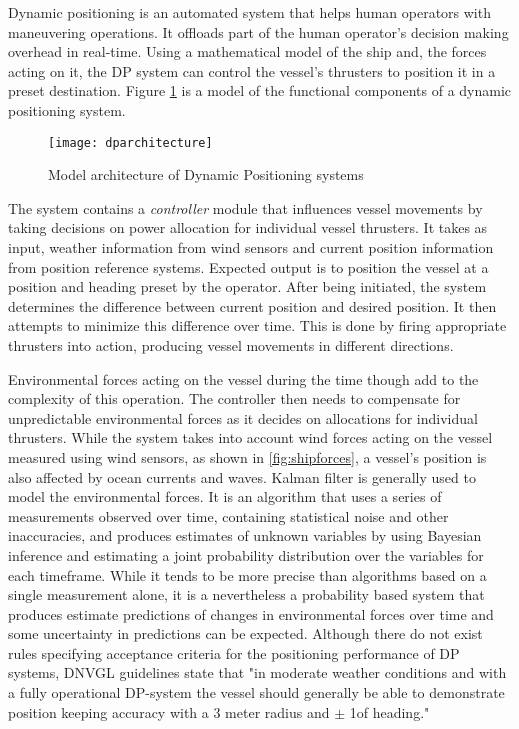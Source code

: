 Dynamic positioning is an automated system that helps human operators with maneuvering operations. It offloads part of the human operator's decision making overhead in real-time. Using a mathematical model of the ship and, the forces acting on it, the DP system can control the vessel's thrusters to position it in a preset destination. Figure \ref{fig:dparchitecture} is a model of the functional components of a dynamic positioning system. 

\begin{figure}
	\centering
	\texttt{[image: dparchitecture]}
	\caption{Model architecture of Dynamic Positioning systems}
	\label{fig:dparchitecture}
\end{figure}


The system contains a \textit{controller} module that influences vessel movements by taking decisions on power allocation for individual vessel thrusters. It takes as input, weather information from wind sensors and current position information from position reference systems. Expected output is to position the vessel at a position and heading preset by the operator. After being initiated, the system determines the difference between current position and desired position. It then attempts to minimize this difference over time. This is done by firing appropriate thrusters into action, producing vessel movements in different directions. 

Environmental forces acting on the vessel during the time though add to the complexity of this operation. The controller then needs to compensate for unpredictable environmental forces as it decides on allocations for individual thrusters.  While the system takes into account wind forces acting on the vessel measured using wind sensors, as shown in \ref{fig:shipforces}, a vessel's position is also affected by ocean currents and waves. Kalman filter is generally used to model the environmental forces. It is an algorithm that uses a series of measurements observed over time, containing statistical noise and other inaccuracies, and produces estimates of unknown variables by using Bayesian inference and estimating a joint probability distribution over the variables for each timeframe. While it tends to be more precise than algorithms based on a single measurement alone, it is a nevertheless a probability based system that produces estimate predictions of changes in environmental forces over time and some uncertainty in predictions can be expected. Although there do not exist rules specifying acceptance criteria for the positioning performance of DP systems, DNVGL guidelines state that "in moderate weather conditions and with a fully operational DP-system the vessel should generally be able to demonstrate position keeping accuracy with a 3 meter radius and $ \pm $ 1\degree of heading." \cite{veritas2011dynamic} 

